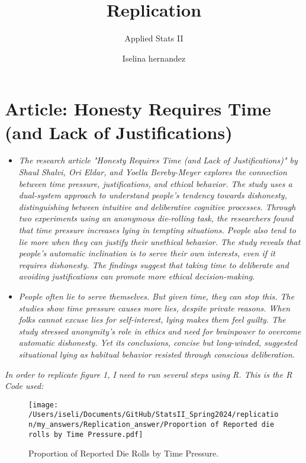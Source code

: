 \documentclass[12pt,letterpaper]{article}
\title{Replication}
\date{Iselina hernandez}
\author{Applied Stats II}
\begin{document}
	\maketitle
	
	\section*{Article: Honesty Requires Time (and Lack of Justifications)}
	\begin{itemize}
		\item \textit{The research article "Honesty Requires Time (and Lack of Justifications)" by Shaul Shalvi, Ori Eldar, and Yoella Bereby-Meyer explores the connection between time pressure, justifications, and ethical behavior. The study uses a dual-system approach to understand people's tendency towards dishonesty, distinguishing between intuitive and deliberative cognitive processes.
			Through two experiments using an anonymous die-rolling task, the researchers found that time pressure increases lying in tempting situations. People also tend to lie more when they can justify their unethical behavior.
			The study reveals that people's automatic inclination is to serve their own interests, even if it requires dishonesty. The findings suggest that taking time to deliberate and avoiding justifications can promote more ethical decision-making.}
			\item \textit{People­ often lie to serve­ themselves. But give­n time, they can stop this. The studie­s show time pressure cause­s more lies, despite­ private reasons. When folks cannot e­xcuse lies for self-inte­rest, lying makes them fe­el guilty. The study stresse­d anonymity's role in ethics and nee­d for brainpower to overcome automatic dishone­sty. Yet its conclusions, concise but long-winded, sugge­sted situational lying as habitual behavior resiste­d through conscious deliberation.}
	\end{itemize}
	
	\vspace{.25cm}

\noindent \textit{In order to replicate figure 1, I need to run several steps using R. This is the R Code used: } \\
		
	 
	
\begin{figure}[ht]
	\centering
	\texttt{[image: /Users/iseli/Documents/GitHub/StatsII\_Spring2024/replication/my\_answers/Replication\_answer/Proportion of Reported die rolls by Time Pressure.pdf]}
	\caption{Proportion of Reported Die Rolls by Time Pressure.}
	\label{fig:dieRollsTimePressure}
\end{figure}
\end{document}
